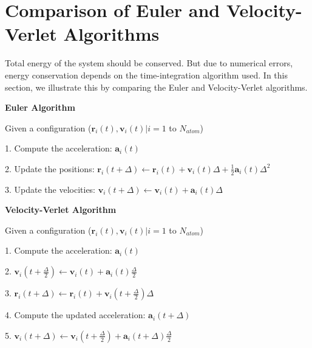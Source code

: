 \documentclass[11pt, oneside]{article}   	%
\begin{document}
\section{Comparison of Euler and Velocity-Verlet Algorithms}
\vspace{-2ex} Total energy of the system should be conserved. But due to numerical errors, energy conservation depends on the time-integration algorithm used. In this section, we illustrate this by comparing the Euler and Velocity-Verlet algorithms.
 
\begin{framed}
	\textbf{Euler Algorithm}
	
	Given a configuration ($\boldsymbol{r}_i(t), \boldsymbol{v}_i(t) | i = 1$ to $N_{atom}$)
	
	1. Compute the acceleration: $\boldsymbol{a}_i(t)$
	
	2. Update the positions: $\boldsymbol{r}_i(t + \Delta) \leftarrow \boldsymbol{r}_i(t) + \boldsymbol{v}_i(t) \Delta + \frac{1}{2}\boldsymbol{a}_i(t) \Delta^2$
	
	3. Update the velocities: $\boldsymbol{v}_i(t + \Delta) \leftarrow \boldsymbol{v}_i(t) + \boldsymbol{a}_i(t) \Delta $
\end{framed}

\begin{framed}
	\textbf{Velocity-Verlet Algorithm}
	
	Given a configuration ($\boldsymbol{r}_i(t), \boldsymbol{v}_i(t) | i = 1$ to $N_{atom}$)
	
	1. Compute the acceleration: $\boldsymbol{a}_i(t)$
	
	2. $\boldsymbol{v}_i(t + \frac{\Delta}{2}) \leftarrow \boldsymbol{v}_i(t) + \boldsymbol{a}_i(t) \frac{\Delta}{2} $
	
	3. $\boldsymbol{r}_i(t + \Delta) \leftarrow \boldsymbol{r}_i(t) + \boldsymbol{v}_i(t+\frac{\Delta}{2}) \Delta $
	
	4. Compute the updated acceleration: $\boldsymbol{a}_i(t + \Delta)$
	
	5. $\boldsymbol{v}_i(t + \Delta) \leftarrow \boldsymbol{v}_i(t+\frac{\Delta}{2}) + \boldsymbol{a}_i(t +\Delta) \frac{\Delta}{2} $
\end{framed}
\end{document}
